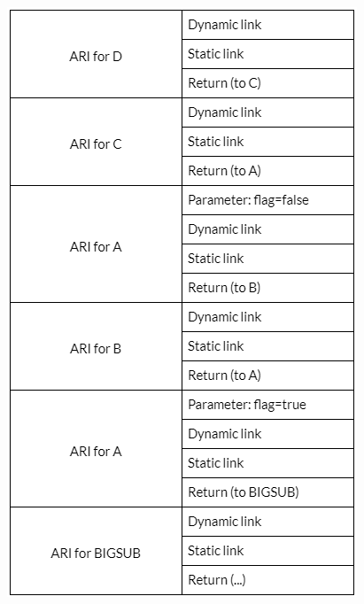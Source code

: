 \documentclass[12pt]{book}
\begin{document}
\begin{enumerate}
    \includegraphics[scale=1.4]{D4_Q4_answer.png}





\end{enumerate}
\end{document}
